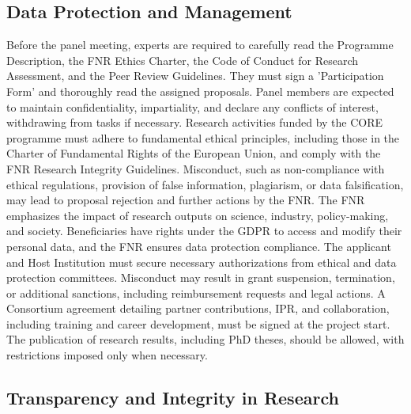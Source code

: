 \documentclass[12pt]{article}
\begin{document}
\subsection{Data Protection and Management}

Before the panel meeting, experts are required to carefully read the Programme Description, the FNR Ethics Charter, the Code of Conduct for Research Assessment, and the Peer Review Guidelines. They must sign a 'Participation Form' and thoroughly read the assigned proposals. Panel members are expected to maintain confidentiality, impartiality, and declare any conflicts of interest, withdrawing from tasks if necessary. Research activities funded by the CORE programme must adhere to fundamental ethical principles, including those in the Charter of Fundamental Rights of the European Union, and comply with the FNR Research Integrity Guidelines. Misconduct, such as non-compliance with ethical regulations, provision of false information, plagiarism, or data falsification, may lead to proposal rejection and further actions by the FNR. The FNR emphasizes the impact of research outputs on science, industry, policy-making, and society. Beneficiaries have rights under the GDPR to access and modify their personal data, and the FNR ensures data protection compliance. The applicant and Host Institution must secure necessary authorizations from ethical and data protection committees. Misconduct may result in grant suspension, termination, or additional sanctions, including reimbursement requests and legal actions. A Consortium agreement detailing partner contributions, IPR, and collaboration, including training and career development, must be signed at the project start. The publication of research results, including PhD theses, should be allowed, with restrictions imposed only when necessary.

\subsection{Transparency and Integrity in Research}
\end{document}
